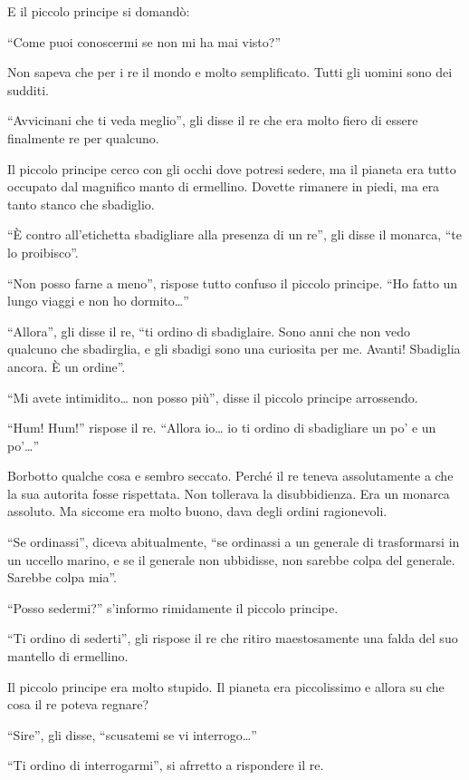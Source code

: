 \documentclass[11pt]{scrbook}
\begin{document}
E il piccolo principe si domandò:

``Come puoi conoscermi se non mi ha mai visto?''

Non sapeva che per i re il mondo e molto semplificato. Tutti gli uomini
sono dei sudditi.

``Avvicinani che ti veda meglio'', gli disse il re che era molto fiero
di essere finalmente re per qualcuno.

Il piccolo principe cerco con gli occhi dove potresi sedere, ma il
pianeta era tutto occupato dal magnifico manto di ermellino. Dovette
rimanere in piedi, ma era tanto stanco che sbadiglio.

``È contro all'etichetta sbadigliare alla presenza di un re'', gli disse
il monarca, ``te lo proibisco''.

``Non posso farne a meno'', rispose tutto confuso il piccolo principe.
``Ho fatto un lungo viaggi e non ho dormito\ldots{}''

``Allora'', gli disse il re, ``ti ordino di sbadiglaire. Sono anni che
non vedo qualcuno che sbadirglia, e gli sbadigi sono una curiosita per
me. Avanti! Sbadiglia ancora. È un ordine''.

``Mi avete intimidito\ldots{} non posso più'', disse il piccolo principe
arrossendo.

``Hum! Hum!'' rispose il re. ``Allora io\ldots{} io ti ordino di
sbadigliare un po' e un po'\ldots{}''

Borbotto qualche cosa e sembro seccato. Perché il re teneva
assolutamente a che la sua autorita fosse rispettata. Non tollerava la
disubbidienza. Era un monarca assoluto. Ma siccome era molto buono, dava
degli ordini ragionevoli.

``Se ordinassi'', diceva abitualmente, ``se ordinassi a un generale di
trasformarsi in un uccello marino, e se il generale non ubbidisse, non
sarebbe colpa del generale. Sarebbe colpa mia''.

``Posso sedermi?'' s'informo rimidamente il piccolo principe.

``Ti ordino di sederti'', gli rispose il re che ritiro maestosamente una
falda del suo mantello di ermellino.

Il piccolo principe era molto stupido. Il pianeta era piccolissimo e
allora su che cosa il re poteva regnare?

``Sire'', gli disse, ``scusatemi se vi interrogo\ldots{}''

``Ti ordino di interrogarmi'', si afrretto a rispondere il re.
\end{document}

